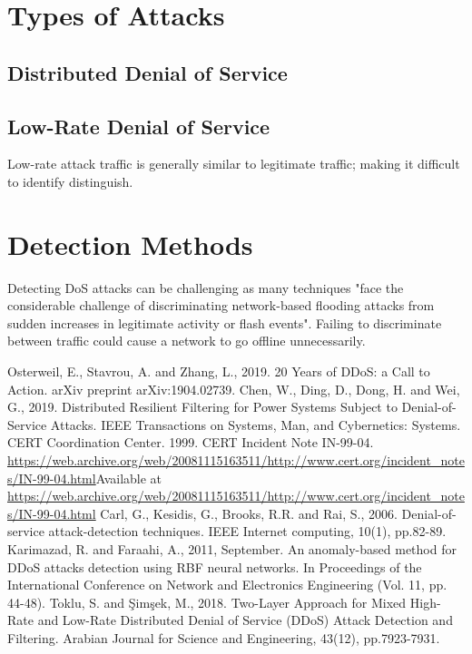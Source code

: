 \documentclass[conference, a4paper]{IEEEtran}
\begin{document}
\section{Types of Attacks}
\subsection{Distributed Denial of Service}
\subsection{Low-Rate Denial of Service}
Low-rate attack traffic is generally similar to legitimate traffic; making it difficult to identify distinguish.\cite{two_layer_approach__DDOS}


\section{Detection Methods}
Detecting DoS attacks can be challenging as many techniques "face the considerable challenge of discriminating network-based flooding attacks from sudden increases in legitimate activity or flash events".\cite{detection_methods_2006}
Failing to discriminate between traffic could cause a network to go offline unnecessarily.

\begin{thebibliography}{00}
    Osterweil, E., Stavrou, A. and Zhang, L., 2019. 20 Years of DDoS: a Call to Action. arXiv preprint arXiv:1904.02739.
    Chen, W., Ding, D., Dong, H. and Wei, G., 2019. Distributed Resilient Filtering for Power Systems Subject to Denial-of-Service Attacks. IEEE Transactions on Systems, Man, and Cybernetics: Systems.
    CERT Coordination Center. 1999. CERT Incident Note IN-99-04. \url{https://web.archive.org/web/20081115163511/http://www.cert.org/incident_notes/IN-99-04.html}Available at \url{https://web.archive.org/web/20081115163511/http://www.cert.org/incident_notes/IN-99-04.html}
    Carl, G., Kesidis, G., Brooks, R.R. and Rai, S., 2006. Denial-of-service attack-detection techniques. IEEE Internet computing, 10(1), pp.82-89.
    Karimazad, R. and Faraahi, A., 2011, September. An anomaly-based method for DDoS attacks detection using RBF neural networks. In Proceedings of the International Conference on Network and Electronics Engineering (Vol. 11, pp. 44-48).
    Toklu, S. and Şimşek, M., 2018. Two-Layer Approach for Mixed High-Rate and Low-Rate Distributed Denial of Service (DDoS) Attack Detection and Filtering. Arabian Journal for Science and Engineering, 43(12), pp.7923-7931.
\end{thebibliography}

\vspace{12pt}
\end{document}
